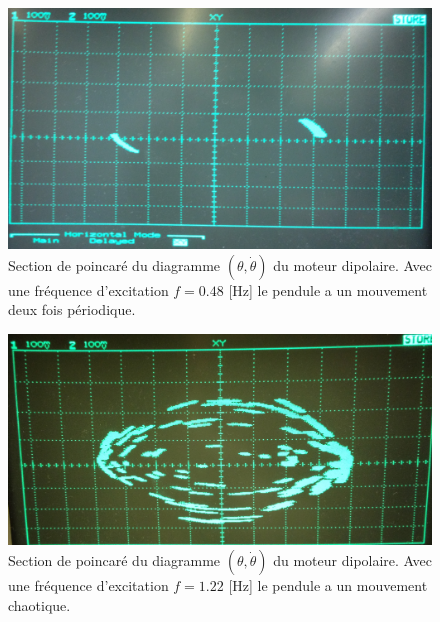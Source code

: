\documentclass[a4paper,12pt,oneside]{article}
\begin{document}
\begin{figure}[h!]
  \begin{center}
  \includegraphics[width=0.5\linewidth,angle=0]{./figures/2T_0_48Hz.png}
  \caption{Section de poincaré du diagramme $(\theta,\dot{\theta})$ du moteur dipolaire. Avec une fréquence d'excitation $f=0.48$ [Hz] le pendule a un mouvement deux fois périodique.} \label{fig:dipol2T}
  \end{center}
\end{figure}

\begin{figure}[h!]
  \begin{center}
  \includegraphics[width=0.5\linewidth,angle=0]{./figures/chao_1_22Hz_v2.png}
  \caption{Section de poincaré du diagramme $(\theta,\dot{\theta})$ du moteur dipolaire. Avec une fréquence d'excitation $f=1.22$ [Hz] le pendule a un mouvement chaotique.} \label{fig:chaos}
  \end{center}
\end{figure}








\end{document}
